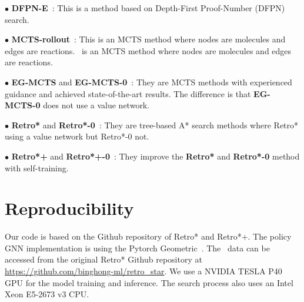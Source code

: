 \documentclass[sigconf]{acmart}
\begin{document}
$\bullet$ \textbf{DFPN-E}~\citep{kishimoto2019depth}:  This is a  method based on Depth-First Proof-Number (DFPN) search.

$\bullet$ \textbf{MCTS-rollout}~\citep{Hong2021}: This is an MCTS method where nodes are molecules and edges are reactions.~\citep{Hong2021} is an MCTS method where nodes are molecules and edges are reactions.

$\bullet$ \textbf{EG-MCTS} and \textbf{EG-MCTS-0}~\citep{Hong2021}: They are MCTS methods with experienced guidance and achieved state-of-the-art results. The difference is that \textbf{EG-MCTS-0} does not use a value network.

$\bullet$ \textbf{Retro*} and \textbf{Retro*-0}~\citep{Chen2020}: They are tree-based A* search methods where Retro* using a value network but Retro*-0 not.

$\bullet$ \textbf{Retro*+} and \textbf{Retro*+-0}~\cite{Kim2021}: They improve the \textbf{Retro*} and \textbf{Retro*-0} method with self-training. 

\section{Reproducibility}

Our code is based on the Github repository of Retro* and Retro*+.
The policy GNN implementation is using the Pytorch Geometric~\citep{Fey/Lenssen/2019}.
The \uspto~data can be accessed from the original Retro* Github repository at \url{https://github.com/binghong-ml/retro_star}.
We use a NVIDIA TESLA P40 GPU for the model training and inference.
The search process also uses an Intel Xeon E5-2673 v3 CPU.
\end{document}
